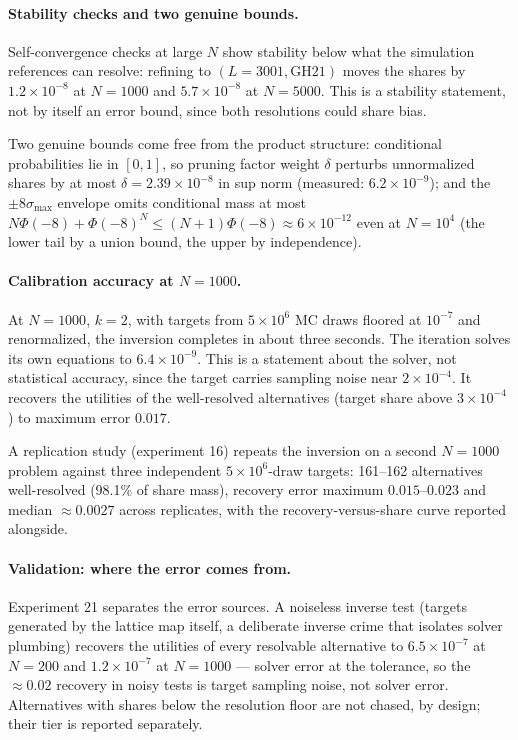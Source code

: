 \documentclass[12pt]{article}
\theoremstyle{remark}
\begin{document}
\paragraph{Stability checks and two genuine bounds.} Self-convergence
checks at large $N$ show stability below what the
simulation references can resolve: refining to $(L = 3001, \mathrm{GH}21)$
moves the shares by $1.2\times10^{-8}$ at $N=1000$ and
$5.7\times10^{-8}$ at $N=5000$. This is a stability statement, not by
itself an error bound, since both resolutions could share bias.

Two genuine bounds
come free from the product structure: conditional probabilities lie in
$[0,1]$, so pruning factor weight $\delta$ perturbs unnormalized shares by
at most $\delta = 2.39\times10^{-8}$ in sup norm (measured:
$6.2\times10^{-9}$); and the $\pm8\sigma_{\max}$ envelope omits
conditional mass at most $N\Phi(-8) + \Phi(-8)^N \le (N+1)\Phi(-8)
\approx 6\times10^{-12}$ even at $N = 10^4$ (the lower tail by a union
bound, the upper by independence).

\paragraph{Calibration accuracy at $N=1000$.}

At $N=1000$, $k=2$, with targets from
$5\times10^6$ MC draws floored at $10^{-7}$ and renormalized, the inversion
completes in about three seconds. The iteration solves its own equations
to $6.4\times10^{-9}$. This is a statement about the solver, not
statistical accuracy, since the target carries sampling noise near
$2\times10^{-4}$. It recovers the utilities
of the well-resolved alternatives (target share above $3\times10^{-4}$)
to maximum error $0.017$.

A replication study (experiment
16) repeats the inversion on a second $N=1000$ problem against three
independent $5\times10^6$-draw targets: 161--162
alternatives well-resolved (98.1\% of share mass), recovery error maximum
$0.015$--$0.023$ and median $\approx 0.0027$ across replicates, with the
recovery-versus-share curve reported alongside.

\paragraph{Validation: where the error comes from.} Experiment 21
separates the error sources. A noiseless inverse
test (targets generated by the lattice map itself, a deliberate inverse
crime that isolates solver plumbing) recovers the utilities of every
resolvable alternative to $6.5\times10^{-7}$ at $N=200$ and
$1.2\times10^{-7}$ at $N=1000$ --- solver error at the tolerance, so the
$\approx 0.02$ recovery in noisy tests is target sampling noise, not
solver error. Alternatives with shares below the resolution floor are not
chased, by design; their tier is reported separately.
\end{document}
